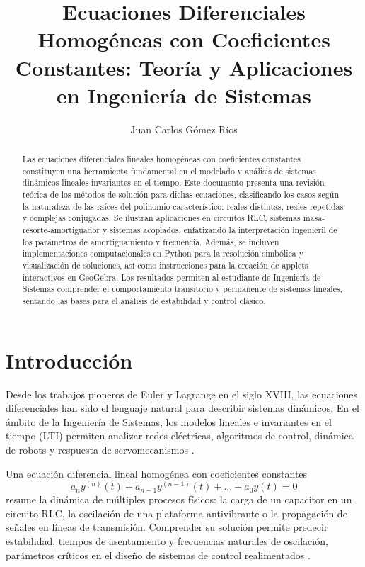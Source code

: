 \documentclass[stu,12pt,a4paper,hidelinks]{apa7}
\title{Ecuaciones Diferenciales Homogéneas con Coeficientes Constantes: Teoría y Aplicaciones en Ingeniería de Sistemas}
\author{Juan Carlos Gómez Ríos}
\affiliation{Universidad Tecnológica de Pereira, Facultad de Ingeniería de Sistemas}
\begin{document}
\maketitle

\begin{abstract}
Las ecuaciones diferenciales lineales homogéneas con coeficientes constantes constituyen una herramienta fundamental en el modelado y análisis de sistemas dinámicos lineales invariantes en el tiempo. Este documento presenta una revisión teórica de los métodos de solución para dichas ecuaciones, clasificando los casos según la naturaleza de las raíces del polinomio característico: reales distintas, reales repetidas y complejas conjugadas. Se ilustran aplicaciones en circuitos RLC, sistemas masa-resorte-amortiguador y sistemas acoplados, enfatizando la interpretación ingenieril de los parámetros de amortiguamiento y frecuencia. Además, se incluyen implementaciones computacionales en Python para la resolución simbólica y visualización de soluciones, así como instrucciones para la creación de applets interactivos en GeoGebra. Los resultados permiten al estudiante de Ingeniería de Sistemas comprender el comportamiento transitorio y permanente de sistemas lineales, sentando las bases para el análisis de estabilidad y control clásico.
\end{abstract}

\section{Introducción}
Desde los trabajos pioneros de Euler y Lagrange en el siglo XVIII, las ecuaciones diferenciales han sido el lenguaje natural para describir sistemas dinámicos. En el ámbito de la Ingeniería de Sistemas, los modelos lineales e invariantes en el tiempo (LTI) permiten analizar redes eléctricas, algoritmos de control, dinámica de robots y respuesta de servomecanismos \citep{ogata2010modern}.

Una ecuación diferencial lineal homogénea con coeficientes constantes
\begin{equation}\label{eq:edo_general}
a_n y^{(n)}(t) + a_{n-1} y^{(n-1)}(t) + \dots + a_0 y(t) = 0
\end{equation}
resume la dinámica de múltiples procesos físicos: la carga de un capacitor en un circuito RLC, la oscilación de una plataforma antivibrante o la propagación de señales en líneas de transmisión. Comprender su solución permite predecir estabilidad, tiempos de asentamiento y frecuencias naturales de oscilación, parámetros críticos en el diseño de sistemas de control realimentados \citep{dorf2011modern}.
\end{document}

